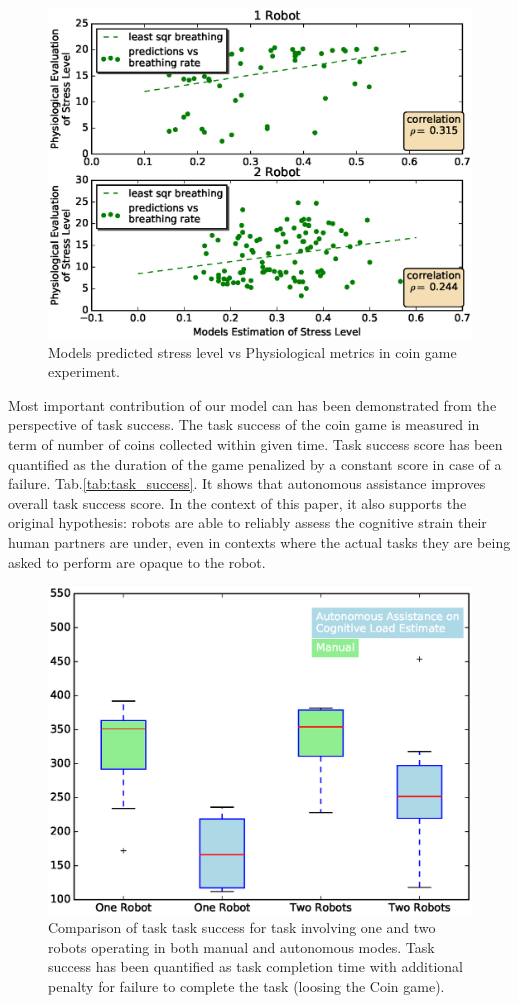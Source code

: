 \documentclass{sig-alternate}
\begin{document}
\begin{figure}  
\centering
\includegraphics[width=.5\textwidth]{prediction_vs_b_p_2.eps}
\caption{Models predicted stress level vs Physiological metrics in coin game experiment.}
\label{fig:pred_phy}
\end{figure}

Most important contribution of our model can has been demonstrated from the perspective of task success. The task
success of the coin game is measured in term of number of coins collected within given time. Task success score has been quantified as the duration of the game penalized by a constant score in case of a failure. Tab.\ref{tab:task_success}.
It shows that autonomous assistance improves overall task success score. In the context of this paper, it also supports the
original hypothesis: robots are able to reliably assess the cognitive strain their human partners are under, even in
contexts where the actual tasks they are being asked to perform are opaque to the robot.

\begin{figure}
\centering
\includegraphics[width=.5\textwidth]{BoxWiskerTimesCompMaualVsAuto2.eps}
\caption{Comparison of task task success for task involving one and two robots operating in both manual and autonomous modes. Task success has been quantified as task completion time with additional penalty for failure to complete the task (loosing the Coin game).}
\label{fig:BoxWiskersTimeComp}
\end{figure}
\end{document}
